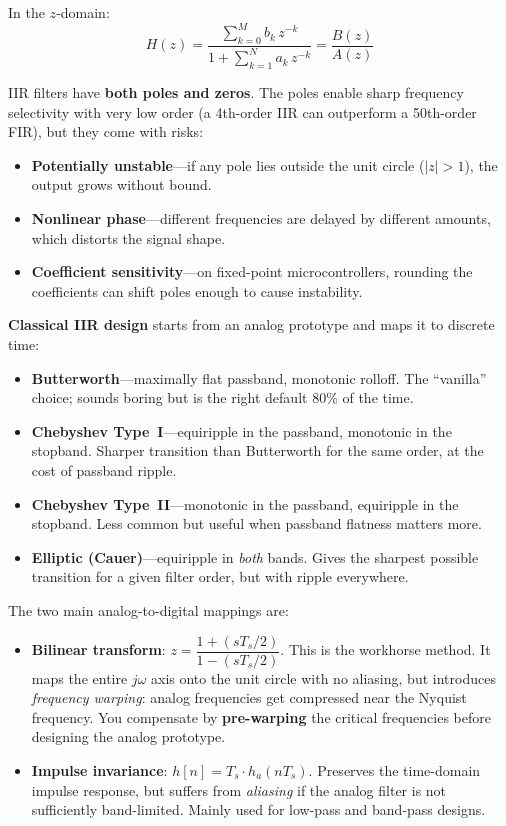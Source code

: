In the $z$-domain:
\begin{equation}
H(z) = \frac{\displaystyle\sum_{k=0}^{M} b_k \, z^{-k}}
            {1 + \displaystyle\sum_{k=1}^{N} a_k \, z^{-k}}
     = \frac{B(z)}{A(z)}
\end{equation}

IIR filters have \textbf{both poles and zeros}. The poles enable sharp frequency
selectivity with very low order (a 4th-order IIR can outperform a 50th-order FIR),
but they come with risks:
\begin{itemize}
    \item \textbf{Potentially unstable}---if any pole lies outside the unit circle
          ($|z| > 1$), the output grows without bound.
    \item \textbf{Nonlinear phase}---different frequencies are delayed by different
          amounts, which distorts the signal shape.
    \item \textbf{Coefficient sensitivity}---on fixed-point microcontrollers,
          rounding the coefficients can shift poles enough to cause instability.
\end{itemize}

\textbf{Classical IIR design} starts from an analog prototype and maps it to
discrete time:
\begin{itemize}
    \item \textbf{Butterworth}---maximally flat passband, monotonic rolloff. The
          ``vanilla'' choice; sounds boring but is the right default 80\% of the time.
    \item \textbf{Chebyshev Type~I}---equiripple in the passband, monotonic in the
          stopband. Sharper transition than Butterworth for the same order, at the
          cost of passband ripple.
    \item \textbf{Chebyshev Type~II}---monotonic in the passband, equiripple in the
          stopband. Less common but useful when passband flatness matters more.
    \item \textbf{Elliptic (Cauer)}---equiripple in \textit{both} bands. Gives the
          sharpest possible transition for a given filter order, but with ripple
          everywhere.
\end{itemize}

The two main analog-to-digital mappings are:
\begin{itemize}
    \item \textbf{Bilinear transform}: $z = \dfrac{1 + (sT_s/2)}{1 - (sT_s/2)}$.
          This is the workhorse method. It maps the entire $j\omega$ axis onto the
          unit circle with no aliasing, but introduces \textit{frequency warping}:
          analog frequencies get compressed near the Nyquist frequency.
          You compensate by \textbf{pre-warping} the critical frequencies before
          designing the analog prototype.
    \item \textbf{Impulse invariance}: $h[n] = T_s \cdot h_a(nT_s)$.
          Preserves the time-domain impulse response, but suffers from
          \textit{aliasing} if the analog filter is not sufficiently band-limited.
          Mainly used for low-pass and band-pass designs.
\end{itemize}

